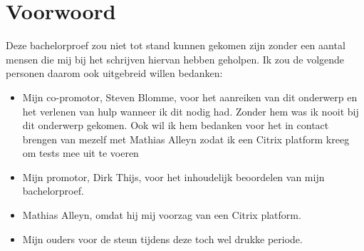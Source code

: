 
\chapter*{Voorwoord}
\label{ch:voorwoord}


Deze bachelorproef zou niet tot stand kunnen gekomen zijn zonder een aantal mensen die mij bij het schrijven hiervan hebben geholpen. Ik zou de volgende personen daarom ook uitgebreid willen bedanken:

\begin{itemize}
	\item Mijn co-promotor, Steven Blomme, voor het aanreiken van dit onderwerp en het verlenen van hulp wanneer ik dit nodig had. Zonder hem was ik nooit bij dit onderwerp gekomen. Ook wil ik hem bedanken voor het in contact brengen van mezelf met Mathias Alleyn zodat ik een Citrix platform kreeg om tests mee uit te voeren
	
	\item Mijn promotor, Dirk Thijs, voor het inhoudelijk beoordelen van mijn bachelorproef.
	
	\item Mathias Alleyn, omdat hij mij voorzag van een Citrix platform.
	
	\item Mijn ouders voor de steun tijdens deze toch wel drukke periode.
\end{itemize}